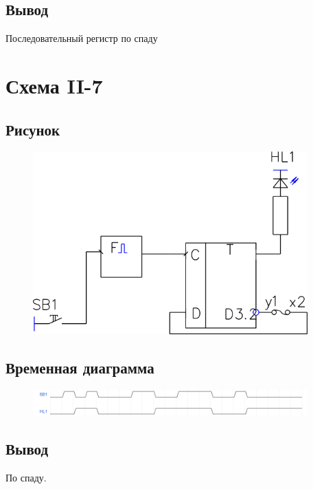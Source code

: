\documentclass[a4paper]{article}
\begin{document}
\subsection{Вывод}
Последовательный регистр по спаду


\section{Схема II-7}




\subsection{Рисунок}
\begin{figure}[H]
    \centering
    \includegraphics[width=300pt]{s7.png}
\end{figure}

\subsection{Временная диаграмма}
\begin{figure}[H]
    \centering
    \includegraphics[width=300pt]{d7.png}
\end{figure}


\subsection{Вывод}
По спаду.
\end{document}
